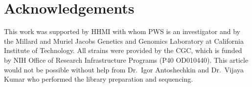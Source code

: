 \documentclass[10pt, onecolumn]{article}
\begin{document}
\section*{Acknowledgements}
This work was supported by HHMI with whom PWS is an investigator and by the
Millard and Muriel Jacobs Genetics and Genomics Laboratory at California
Institute of Technology. All strains were provided by the CGC, which is funded
by NIH Office of Research Infrastructure Programs (P40 OD010440). This article
would not be possible without help from Dr.\ Igor Antoshechkin and Dr.\ Vijaya
Kumar who performed the library preparation and sequencing.




\end{document}
